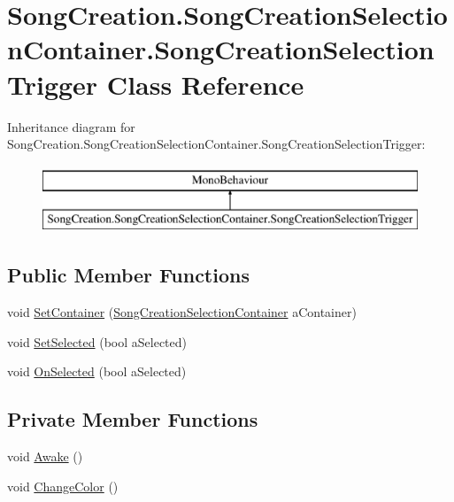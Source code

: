 \hypertarget{class_song_creation_1_1_song_creation_selection_container_1_1_song_creation_selection_trigger}{}\section{Song\+Creation.\+Song\+Creation\+Selection\+Container.\+Song\+Creation\+Selection\+Trigger Class Reference}
\label{class_song_creation_1_1_song_creation_selection_container_1_1_song_creation_selection_trigger}
Inheritance diagram for Song\+Creation.\+Song\+Creation\+Selection\+Container.\+Song\+Creation\+Selection\+Trigger\+:\begin{figure}[H]
\begin{center}
\leavevmode
\includegraphics[height=2.000000cm]{class_song_creation_1_1_song_creation_selection_container_1_1_song_creation_selection_trigger}
\end{center}
\end{figure}
\subsection*{Public Member Functions}
\begin{DoxyCompactItemize}
\item 
void \hyperlink{class_song_creation_1_1_song_creation_selection_container_1_1_song_creation_selection_trigger_aa9ae3234792bb4a0ee0cb16d00563130}{Set\+Container} (\hyperlink{class_song_creation_1_1_song_creation_selection_container}{Song\+Creation\+Selection\+Container} a\+Container)
\item 
void \hyperlink{class_song_creation_1_1_song_creation_selection_container_1_1_song_creation_selection_trigger_a477673c43fb3b828ed54d06d00e93f08}{Set\+Selected} (bool a\+Selected)
\item 
void \hyperlink{class_song_creation_1_1_song_creation_selection_container_1_1_song_creation_selection_trigger_a33e6eb8e123cb32f40c2c06149a31087}{On\+Selected} (bool a\+Selected)
\end{DoxyCompactItemize}
\subsection*{Private Member Functions}
\begin{DoxyCompactItemize}
\item 
void \hyperlink{class_song_creation_1_1_song_creation_selection_container_1_1_song_creation_selection_trigger_a1d7d3017d7cc312657926de99f04d73c}{Awake} ()
\item 
void \hyperlink{class_song_creation_1_1_song_creation_selection_container_1_1_song_creation_selection_trigger_a3e790d06e364f26ed6f8a78cb87bbf6d}{Change\+Color} ()
\end{DoxyCompactItemize}
